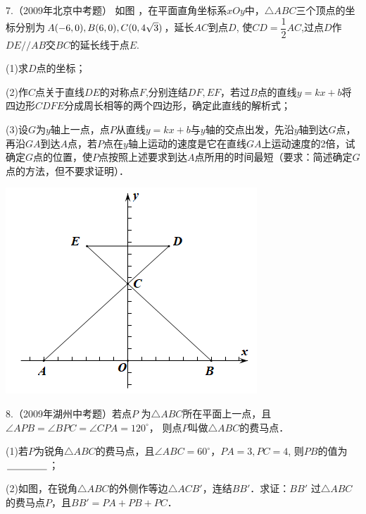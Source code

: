 \documentclass[10pt]{ctexart}
\begin{document}
\vspace{1cm}

\begin{shaded}
7.（2009年北京中考题） 如图 ，在平面直角坐标系$xOy$中，$\triangle ABC$三个顶点的坐标分别为$A(-6,0),B(6,0),\\
C(0,4\sqrt{3})$，延长$AC$到点$D$, 使$CD=\dfrac{1}{2}AC$,过点$D$作$DE//AB$交$BC$的延长线于点$E$.

(1)求$D$点的坐标；     
                         
(2)作$C$点关于直线$DE$的对称点$F$,分别连结$DF,EF$，若过$B$点的直线$y=kx+b$将四边形$CDFE$分成周长相等的两个四边形，确定此直线的解析式；

                         
(3)设$G$为$y$轴上一点，点$P$从直线$y=kx+b$与$y$轴的交点出发，先沿$y$轴到达$G$点，再沿$GA$到达$A$点，若$P$点在$y$轴上运动的速度是它在直线$GA$上运动速度的2倍，试确定$G$点的位置，使$P$点按照上述要求到达$A$点所用的时间最短（要求：简述确定$G$点的方法，但不要求证明）．
\end{shaded}

\begin{center}
	\includegraphics[scale=0.6]{figure/feimadian27}
\end{center}

\vspace{1cm}

\begin{shaded}
8.（2009年湖州中考题）若点$P$ 为$\triangle ABC$所在平面上一点，且$\angle APB=\angle BPC=\angle CPA=120^\circ$， 则点$P$叫做$\triangle ABC$的费马点．

(1)若$P$为锐角$\triangle ABC$的费马点，且$\angle ABC=60^\circ$，$PA=3,PC=4$, 则$PB$的值为$\underline{\hspace{1.5cm}}$；

(2)如图，在锐角$\triangle ABC$的外侧作等边$\triangle ACB′$，连结$BB′$．求证：$BB′$ 过$\triangle ABC$的费马点$P$，且$BB′=PA+PB+PC$．
\end{shaded}
\end{document}
